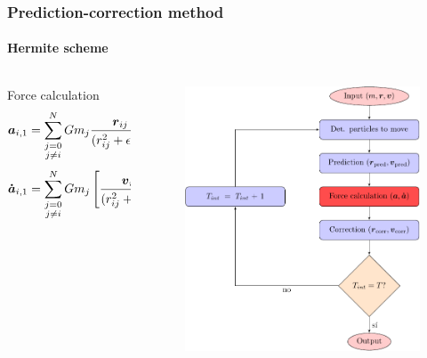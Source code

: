 \begin{frame}
    \frametitle{Prediction-correction method}
    \framesubtitle{Hermite scheme}
    \begin{columns}
        \begin{column}{0.5\textwidth}
            \begin{block}{Force calculation}
                \footnotesize
                \begin{dmath}
                    \bs{a}_{i,1} = \sum_{\substack{j=0\\j\neq i}}^{N} G m_{j}
                                    \frac{\bs{r}_{ij}}
                                           {(r_{ij}^2 + \epsilon^{2})^{\frac{3}{2}}}, \\
                \end{dmath}
                \begin{dmath}
                    \bs{\dot{a}}_{i,1} = \sum_{\substack{j=0\\j\neq i}}^{N} G m_{j}
                                    \left[
                                        \frac{\bs{v}_{ij}}
                                            {(r_{ij}^2 + \epsilon^{2})^{\frac{3}{2}}} -
                                        \frac{3(\bs{v}_{ij}\cdot \bs{r}_{ij}) \bs{r}_{i}}
                                            {(r_{ij}^2 + \epsilon^{2})^{\frac{5}{2}}}
                                    \right],
                \end{dmath}
            \end{block}
        \end{column}
        \begin{column}{0.5\textwidth}
            \begin{figure}
                \centering
                \includegraphics[height=0.7\textheight]{diagrams/algorithm}

\end{figure}
\end{column}
\end{columns}
\end{frame}
